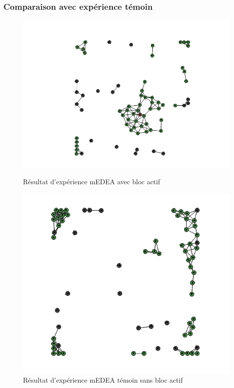 \documentclass[a4paper]{article}
\begin{document}
\subsubsection{Comparaison avec expérience témoin}
\begin{figure}[h]
	\begin{minipage}[c]{.46\linewidth}
		\centering
		\includegraphics[width=1.1\linewidth]{../../script_results/expe_normale.png}
		\caption{Résultat d'expérience mEDEA avec bloc actif }
	\end{minipage}
	\hfill%
	\begin{minipage}[c]{.46\linewidth}
		\centering
		\includegraphics[scale=0.29]{../../script_results/expe_temoin.png}
		\caption{Résultat d'expérience mEDEA témoin sans bloc actif }
	\end{minipage}
\end{figure}
\end{document}
